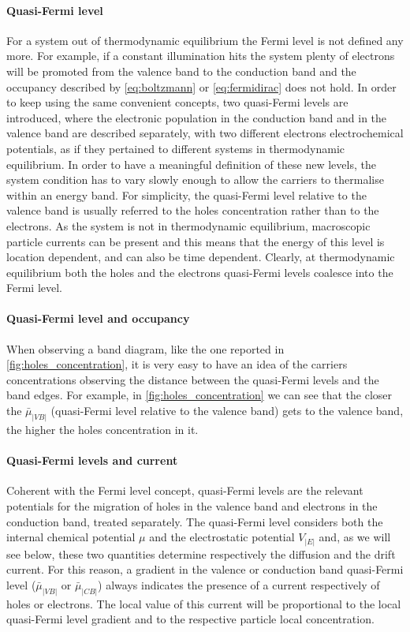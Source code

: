		\paragraph{Quasi-Fermi level}
		For a system out of thermodynamic equilibrium the Fermi level is not defined any more.
		For example, if a constant illumination hits the system plenty of electrons will be promoted from the valence band to the conduction band and the occupancy described by \cref{eq:boltzmann} or \cref{eq:fermidirac} does not hold.
		In order to keep using the same convenient concepts, two quasi\hyp{}Fermi levels are introduced, where the electronic population in the conduction band and in the valence band are described separately, with two different electrons electrochemical potentials, as if they pertained to different systems in thermodynamic equilibrium.
		In order to have a meaningful definition of these new levels, the system condition has to vary slowly enough to allow the carriers to thermalise within an energy band.
		For simplicity, the quasi-Fermi level relative to the valence band is usually referred to the holes concentration rather than to the electrons.
		As the system is not in thermodynamic equilibrium, macroscopic particle currents can be present and this means that the energy of this level is location dependent, and can also be time dependent.
		Clearly, at thermodynamic equilibrium both the holes and the electrons quasi\hyp{}Fermi levels coalesce into the Fermi level.

		\paragraph{Quasi-Fermi level and occupancy}
		When observing a band diagram, like the one reported in \cref{fig:holes_concentration}, it is very easy to have an idea of the carriers concentrations observing the distance between the quasi\hyp{}Fermi levels and the band edges.
		For example, in \cref{fig:holes_concentration} we can see that the closer the $\bar\mu_|VB|$ (quasi\hyp{}Fermi level relative to the valence band) gets to the valence band, the higher the holes concentration in it.

		\paragraph{Quasi\hyp{}Fermi levels and current}
		Coherent with the Fermi level concept, quasi-Fermi levels are the relevant potentials for the migration of holes in the valence band and electrons in the conduction band, treated separately.
		The quasi\hyp{}Fermi level considers both the internal chemical potential $\mu$ and the electrostatic potential $V_|E|$ and, as we will see below, these two quantities determine respectively the diffusion and the drift current.
		For this reason, a gradient in the valence or conduction band quasi\hyp{}Fermi level ($\bar\mu_|VB|$ or $\bar\mu_|CB|$) always indicates the presence of a current respectively of holes or electrons.
		The local value of this current will be proportional to the local quasi\hyp{}Fermi level gradient and to the respective particle local concentration.

